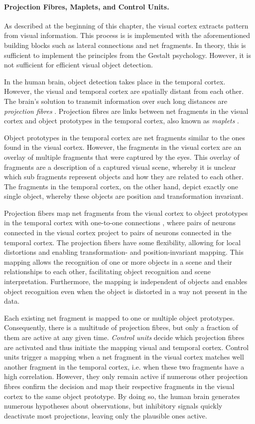 \paragraph{Projection Fibres, Maplets, and Control Units.} As described at the beginning of this chapter, the visual cortex extracts pattern from visual information. This process is is implemented with the aforementioned building blocks such as lateral connections and net fragments. In theory, this is sufficient to implement the principles from the Gestalt psychology. However, it is not sufficient for efficient visual object detection.

In the human brain, object detection takes place in the temporal cortex.
However, the visual and temporal cortex are spatially distant from each other.
The brain's solution to transmit information over such long distances are \emph{projection fibres} .
Projection fibres are links between net fragments in the visual cortex and object prototypes in the temporal cortex, also known as \emph{maplets} .

Object prototypes in the temporal cortex are net fragments similar to the ones found in the visual cortex. However, the fragments in the visual cortex are an overlay of multiple fragments that were captured by the eyes.
This overlay of fragments are a description of a captured visual scene, whereby it is unclear which sub fragments represent objects and how they are related to each other.
The fragments in the temporal cortex, on the other hand, depict exactly one single object, whereby these objects are position and transformation invariant.

Projection fibers map net fragments from the visual cortex to object prototypes in the temporal cortex with one-to-one connections , where pairs of neurons connected in the visual cortex project to pairs of neurons connected in the temporal cortex. The projection fibers have some flexibility, allowing for local distortions and enabling transformation- and position-invariant mapping. This mapping allows the recognition of one or more objects in a scene and their relationships to each other, facilitating object recognition and scene interpretation. Furthermore, the mapping is independent of objects and enables object recognition even when the object is distorted in a way not present in the data.

Each existing net fragment is mapped to one or multiple object prototypes. Consequently, there is a multitude of projection fibres, but only a fraction of them are active at any given time. \emph{Control units} decide which projection fibres are activated and thus initiate the mapping visual and temporal cortex. Control units trigger a mapping when a net fragment in the visual cortex matches well another fragment in the temporal cortex, i.e. when these two fragments have a high correlation. However, they only remain active if numerous other projection fibres confirm the decision and map their respective fragments in the visual cortex to the same object prototype. By doing so, the human brain generates numerous hypotheses about observations, but inhibitory signals quickly deactivate most projections, leaving only the plausible ones active.

